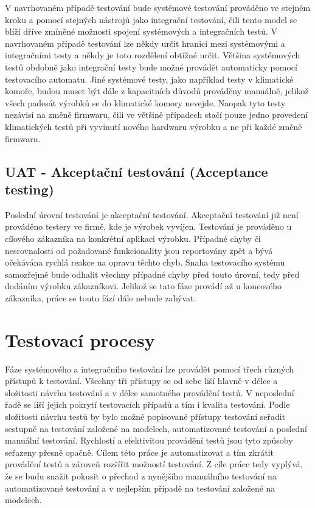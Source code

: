 V navrhovaném případě testování bude systémové testování prováděno ve stejném kroku a pomocí stejných nástrojů jako integrační testování, čili tento model se blíží dříve zmíněné možnosti spojení systémových a integračních testů. V navrhovaném případě testování lze někdy určit hranici mezi systémovými a integračními testy a někdy je toto rozdělení obtížné určit. Většina systémových testů obdobně jako integrační testy bude možné provádět automaticky pomocí testovacího automatu. Jiné systémové testy, jako například testy v klimatické komoře, budou muset být dále z kapacitních důvodů prováděny manuálně, jelikož všech padesát výrobků se do klimatické komory nevejde. Naopak tyto testy nezávisí na změně firmwaru, čili ve většině případech stačí pouze jedno provedení klimatických testů při vyvinutí nového hardwaru výrobku a ne při každé změně firmwaru.

\subsection{UAT - Akceptační testování (Acceptance testing)}
Poslední úrovní testování je akceptační testování. Akceptační testování již není prováděno testery ve firmě, kde je výrobek vyvíjen. Testování je prováděno u cílového zákazníka na konkrétní aplikaci výrobku. Případné chyby či nesrovnalosti od požadované funkcionality jsou reportovány zpět a bývá očekávána rychlá reakce na opravu těchto chyb. Snaha testovacího systému samozřejmě bude odhalit všechny případné chyby před touto úrovní, tedy před dodáním výrobku zákazníkovi. Jelikož se tato fáze provádí až u koncového zákazníka, práce se touto fází dále nebude zabývat.

\section{Testovací procesy}
Fáze systémového a integračního testování lze provádět pomocí třech různých přístupů k testování. Všechny tři přístupy se od sebe liší hlavně v délce a složitosti návrhu testování a v délce samotného provádění testů. V neposlední řadě se liší jejich pokrytí testovacích případů a tím i kvalita testování. Podle složitosti návrhu testů by bylo možné popisované přístupy testování seřadit sestupně na testování založené na modelech, automatizované testování a poslední manuální testování. Rychlostí a efektivitou provádění testů jsou tyto způsoby seřazeny přesně opačně. Cílem této práce je automatizovat a tím zkrátit provádění testů a zároveň rozšířit možností testování. Z cíle práce tedy vyplývá, že se budu snažit pokusit o přechod z nynějšího manuálního testování na automatizované testování a v nejlepším případě na testování založené na modelech.


